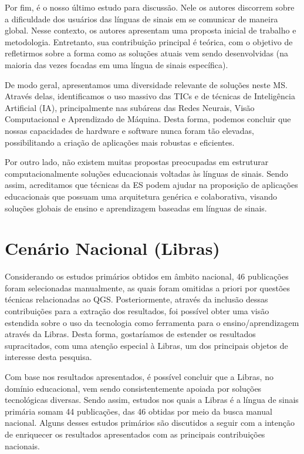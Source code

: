 Por fim,  é o nosso último estudo para discussão. Nele os autores discorrem sobre a dificuldade dos usuários das línguas de sinais em se comunicar de maneira global. Nesse contexto, os autores apresentam uma proposta inicial de trabalho e metodologia. Entretanto, sua contribuição principal é teórica, com o objetivo de refletirmos sobre a forma como as soluções atuais vem sendo desenvolvidas (na maioria das vezes focadas em uma língua de sinais específica).

De modo geral, apresentamos uma diversidade relevante de soluções neste MS. Através delas, identificamos o uso massivo das TICs e de técnicas de Inteligência Artificial (IA), principalmente nas subáreas das Redes Neurais, Visão Computacional e Aprendizado de Máquina. Desta forma, podemos concluir que nossas capacidades de hardware e software nunca foram tão elevadas,  possibilitando a criação de aplicações mais robustas e eficientes.

Por outro lado, não existem muitas propostas preocupadas em estruturar computacionalmente soluções educacionais voltadas às línguas de sinais. Sendo assim, acreditamos que técnicas da ES podem ajudar na proposição de aplicações educacionais que possuam uma arquitetura genérica e colaborativa, visando soluções globais de ensino e aprendizagem baseadas em línguas de sinais.

\section{Cenário Nacional (Libras)}
\label{ms:cenario-nacional}


Considerando os estudos primários obtidos em âmbito nacional, 46 publicações foram selecionadas manualmente, as quais foram omitidas a priori por questões técnicas relacionadas ao QGS. Posteriormente, através da inclusão dessas contribuições para a extração dos resultados, foi possível obter uma visão estendida sobre o uso da tecnologia como ferramenta para o ensino/aprendizagem através da Libras. Desta forma, gostaríamos de estender os resultados supracitados, com uma atenção especial à Libras, um dos principais objetos de interesse desta pesquisa.

Com base nos resultados apresentados, é possível concluir que a Libras, no domínio educacional, vem sendo consistentemente apoiada por soluções tecnológicas diversas. Sendo assim, estudos nos quais a Libras é a língua de sinais primária somam 44 publicações, das 46 obtidas por meio da busca manual nacional. Alguns desses estudos primários são discutidos a seguir com a intenção de enriquecer os resultados apresentados com as principais contribuições nacionais.

